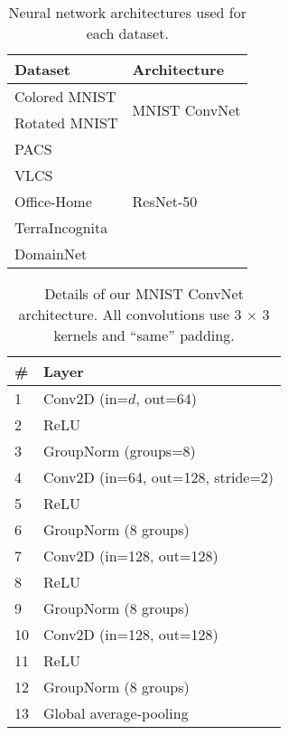 \documentclass{article}
\begin{document}
\begin{minipage}{0.45\textwidth}
    \begin{table}[H]
    \caption{Neural network architectures used for each dataset.} 
\begin{tabular}{ll}
        \toprule
        \textbf{Dataset} & \textbf{Architecture} \\
        \midrule
        Colored MNIST & \multirow{2}{*}{MNIST ConvNet} \\
        Rotated MNIST & \\
        \midrule
        PACS & \multirow{5}{*}{ResNet-50} \\
        VLCS & \\
        Office-Home &  \\
        TerraIncognita &  \\
        DomainNet &  \\
        \bottomrule
        \end{tabular}
\label{table:architectures}
\end{table}
\end{minipage}
\hfill
\begin{minipage}{0.48\textwidth}
\begin{table}[H]
    \caption{Details of our MNIST ConvNet architecture. All convolutions use 3 $\times$ 3 kernels and ``same'' padding.} 
\begin{tabular}{ll}
        \toprule
        \textbf{\#} & \textbf{Layer}\\
        \midrule
            1  & Conv2D (in=$d$, out=64)\\
            2  & ReLU\\
            3  & GroupNorm (groups=8)\\
            4  & Conv2D (in=64, out=128, stride=2)\\
            5  & ReLU\\
            6  & GroupNorm (8 groups)\\
            7  & Conv2D (in=128, out=128)\\
            8  & ReLU\\
            9  & GroupNorm (8 groups)\\
            10 & Conv2D (in=128, out=128)\\
            11 & ReLU\\
            12 & GroupNorm (8 groups)\\
            13 & Global average-pooling\\
        \bottomrule
        \end{tabular}
\label{table:mnist_convnet}
\end{table}
\end{minipage}
\end{document}

